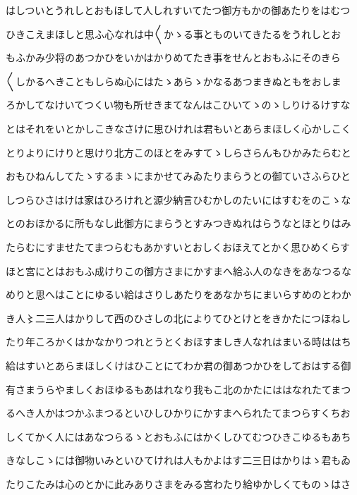 \documentclass[a4paper,11pt,landscape]{ltjtarticle}
\begin{document}
\par\medskip
はしついとうれしとおもほして人しれすいてたつ御方もかの御あたりをはむつ
\par\medskip
ひきこえまほしと思ふ心なれは中〱かゝる事とものいてきたるをうれしとお
\par\medskip
もふかみ少将のあつかひをいかはかりめてたき事をせんとおもふにそのきら
\par\medskip
〱しかるへきこともしらぬ心にはたゝあらゝかなるあつまきぬともをおしま
\par\medskip
ろかしてなけいてつくい物も所せきまてなんはこひいてゝのゝしりけるけすな
\par\medskip
とはそれをいとかしこきなさけに思ひけれは君もいとあらまほしく心かしこく
\par\medskip
とりよりにけりと思けり北方このほとをみすてゝしらさらんもひかみたらむと
\par\medskip
おもひねんしてたゝするまゝにまかせてみゐたりまらうとの御ていさふらひと
\par\medskip
しつらひさはけは家はひろけれと源少納言ひむかしのたいにはすむをのこゝな
\par\medskip
とのおほかるに所もなし此御方にまらうとすみつきぬれはらうなとほとりはみ
\par\medskip
たらむにすませたてまつらむもあかすいとおしくおほえてとかく思ひめくらす
\par\medskip
ほと宮にとはおもふ成けりこの御方さまにかすまへ給ふ人のなきをあなつるな
\par\medskip
めりと思へはことにゆるい給はさりしあたりをあなかちにまいらすめのとわか
\par\medskip
き人〻二三人はかりして西のひさしの北によりてひとけとをきかたにつほねし
\par\medskip
たり年ころかくはかなかりつれとうとくおほすましき人なれはまいる時ははち
\par\medskip
給はすいとあらまほしくけはひことにてわか君の御あつかひをしておはする御
\par\medskip
有さまうらやましくおほゆるもあはれなり我もこ北のかたにははなれたてまつ
\par\medskip
るへき人かはつかふまつるといひしひかりにかすまへられたてまつらすくちお
\par\medskip
しくてかく人にはあなつらるゝとおもふにはかくしひてむつひきこゆるもあち
\par\medskip
きなしこゝには御物いみといひてけれは人もかよはす二三日はかりはゝ君もゐ
\par\medskip
たりこたみは心のとかに此みありさまをみる宮わたり給ゆかしくてものゝはさ
\par\medskip
\end{document}
